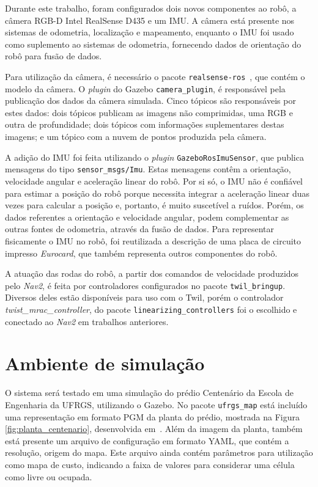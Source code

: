 \documentclass[repeatfields,xlists,xpacks,oneside,yearsonly]{ufrgscca}
\begin{document}
Durante este trabalho, foram configurados dois novos componentes ao
robô, a câmera RGB-D Intel RealSense D435 e um IMU. A câmera está
presente nos sistemas de odometria, localização e mapeamento,
enquanto o IMU foi usado como suplemento ao sistemas de odometria,
fornecendo dados de orientação do robô para fusão de dados.

Para utilização da câmera, é necessário o pacote
\texttt{realsense-ros}~\cite{realsense_ros}, que contém o modelo da
câmera. O \textit{plugin} do Gazebo \texttt{camera\_plugin}, é
responsável pela publicação dos dados da câmera simulada. Cinco
tópicos são responsáveis por estes dados: dois tópicos publicam as
imagens não comprimidas, uma RGB e outra de profundidade; dois
tópicos com informações suplementares destas imagens; e um tópico com
a nuvem de pontos produzida pela câmera.

A adição do IMU foi feita utilizando o \textit{plugin}
\texttt{GazeboRosImuSensor}, que publica mensagens do tipo
\texttt{sensor\_msgs/Imu}. Estas mensagens contêm a orientação,
velocidade angular e aceleração linear do robô. Por si só, o IMU não
é confiável para estimar a posição do robô porque necessita integrar
a aceleração linear duas vezes para calcular a posição e, portanto, é
muito suscetível a ruídos. Porém, os dados referentes a orientação e
velocidade angular, podem complementar as outras fontes de odometria,
através da fusão de dados. Para representar fisicamente o IMU no
robô, foi reutilizada a descrição de uma placa de circuito impresso
\textit{Eurocard}, que também representa outros componentes do robô.

A atuação das rodas do robô, a partir dos comandos de velocidade
produzidos pelo \textit{Nav2}, é feita por controladores configurados
no pacote \texttt{twil\_bringup}. Diversos deles estão disponíveis
para uso com o Twil, porém o controlador
\textit{twist\_mrac\_controller}, do pacote
\texttt{linearizing\_controllers} foi o escolhido e conectado ao
\textit{Nav2} em trabalhos anteriores.

\section{Ambiente de simulação}

O sistema será testado em uma simulação do prédio Centenário da
Escola de Engenharia da UFRGS, utilizando o Gazebo. No pacote
\texttt{ufrgs\_map} está incluído uma representação em formato PGM da
planta do prédio, mostrada na Figura \ref{fig:planta_centenario},
desenvolvida em~\textcite{petry_tcc}. Além da imagem da planta,
também está presente um arquivo de configuração em formato YAML, que
contém a resolução, origem do mapa. Este arquivo ainda contém
parâmetros para utilização como mapa de custo, indicando a faixa de
valores para considerar uma célula como livre ou ocupada.
\end{document}
